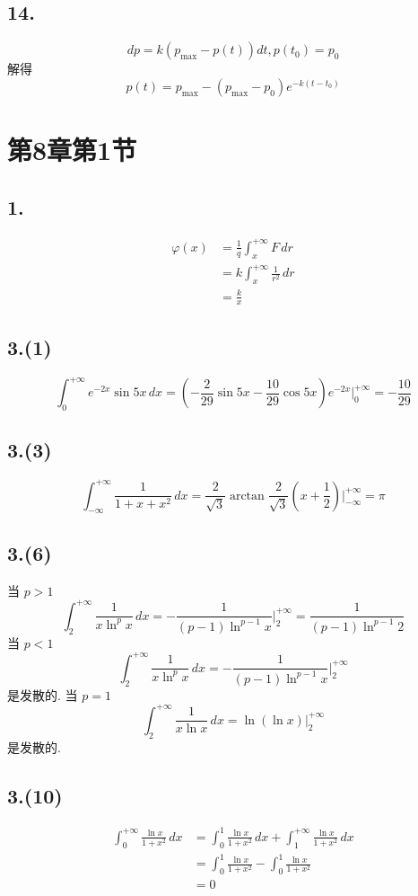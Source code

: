 \documentclass[12pt, a4paper, oneside]{ctexart}
\begin{document}
        \subsection*{14.}
            $$
                dp=k(p_{\max}-p(t))dt, p(t_0)=p_0
            $$
            解得
            $$
                p(t)=p_{\max}-(p_{\max}-p_0)e^{-k(t-t_0)}
            $$
    \section*{第8章第1节}
        \subsection*{1.}
            $$
                \begin{aligned}
                    \varphi(x)&=\frac1q\int_{x}^{+\infty}F\,dr\\
                    &=k\int_{x}^{+\infty}\frac{1}{r^2}\,dr\\
                    &=\frac{k}{x}
                \end{aligned}
            $$
        \subsection*{3.(1)}
            $$
                \int_{0}^{+\infty}e^{-2x}\sin 5x\,dx = (-\frac{2}{29}\sin 5x - \frac{10}{29}\cos 5x)e^{-2x}|^{+\infty}_{0}=-\frac{10}{29}
            $$
        \subsection*{3.(3)}
            $$
                \int_{-\infty}^{+\infty}\frac{1}{1+x+x^2}\,dx = \frac{2}{\sqrt{3}}\arctan{\frac{2}{\sqrt{3}}(x+\frac12)}|_{-\infty}^{+\infty}=\pi
            $$
        \subsection*{3.(6)}
            当 $p>1$
            $$
                \int_{2}^{+\infty}\frac{1}{x\ln^px}\,dx=-\frac{1}{(p-1)\ln^{p-1}x}|^{+\infty}_{2}=\frac{1}{(p-1)\ln^{p-1}2}
            $$
            当 $p<1$
            $$
                \int_{2}^{+\infty}\frac{1}{x\ln^px}\,dx=-\frac{1}{(p-1)\ln^{p-1}x}|^{+\infty}_{2}
            $$
            是发散的.
            当 $p=1$
            $$
                \int_{2}^{+\infty}\frac{1}{x\ln x}\,dx=\ln(\ln x)|^{+\infty}_{2}
            $$
            是发散的.
        \subsection*{3.(10)}
            $$
                \begin{aligned}
                    \int_{0}^{+\infty}\frac{\ln x}{1+x^2}\,dx&=\int_{0}^{1}\frac{\ln x}{1+x^2}\,dx+\int_{1}^{+\infty}\frac{\ln x}{1+x^2}\,dx\\
                    &= \int_{0}^{1}\frac{\ln x}{1+x^2}-\int_{0}^{1}\frac{\ln x}{1+x^2}\\
                    &=0
                \end{aligned}
            $$
\end{document}
